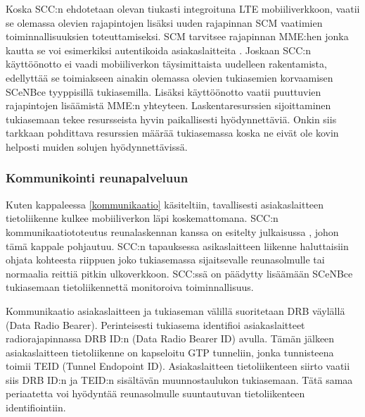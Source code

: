 Koska SCC:n ehdotetaan olevan tiukasti integroituna LTE mobiiliverkkoon, vaatii se olemassa olevien rajapintojen lisäksi uuden rajapinnan SCM vaatimien toiminnallisuuksien toteuttamiseksi. SCM tarvitsee rajapinnan MME:hen jonka kautta se voi esimerkiksi autentikoida asiakaslaitteita \cite{lobillo15scc}. 
Joskaan SCC:n käyttöönotto ei vaadi mobiiliverkon täysimittaista uudelleen rakentamista, edellyttää se toimiakseen ainakin olemassa olevien tukiasemien korvaamisen SCeNBce tyyppisillä tukiasemilla. Lisäksi käyttöönotto vaatii puuttuvien rajapintojen lisäämistä MME:n yhteyteen. 
Laskentaresurssien sijoittaminen tukiasemaan tekee resursseista hyvin paikallisesti hyödynnettäviä. Onkin siis tarkkaan pohdittava resurssien määrää tukiasemassa koska ne eivät ole kovin helposti muiden solujen hyödynnettävissä.

 
%

\subsubsection{Kommunikointi reunapalveluun} \label{GTP}
Kuten kappaleessa \ref{kommunikaatio} käsiteltiin, tavallisesti asiakaslaitteen tietoliikenne kulkee mobiiliverkon läpi koskemattomana. 
SCC:n kommunikaatiototeutus reunalaskennan kanssa on esitelty julkaisussa \cite{puente15seamless}, johon tämä kappale pohjautuu.
SCC:n tapauksessa asikaslaitteen liikenne haluttaisiin ohjata kohteesta riippuen joko tukiasemassa sijaitsevalle reunasolmulle tai normaalia reittiä pitkin ulkoverkkoon.
SCC:ssä on päädytty lisäämään SCeNBce tukiasemaan tietoliikennettä monitoroiva toiminnallisuus.

Kommunikaatio asiakaslaitteen ja tukiaseman välillä suoritetaan DRB väylällä (Data Radio Bearer).
Perinteisesti tukiasema identifioi asiakaslaitteet radiorajapinnassa DRB ID:n (Data Radio Bearer ID) avulla.
Tämän jälkeen asiakaslaitteen tietoliikenne on kapseloitu GTP tunneliin, jonka tunnisteena toimii TEID (Tunnel Endopoint ID).
Asiakaslaitteen tietoliikenteen siirto vaatii siis DRB ID:n ja TEID:n sisältävän muunnostaulukon tukiasemaan.
Tätä samaa periaatetta voi hyödyntää reunasolmulle suuntautuvan tietoliikenteen identifiointiin.

